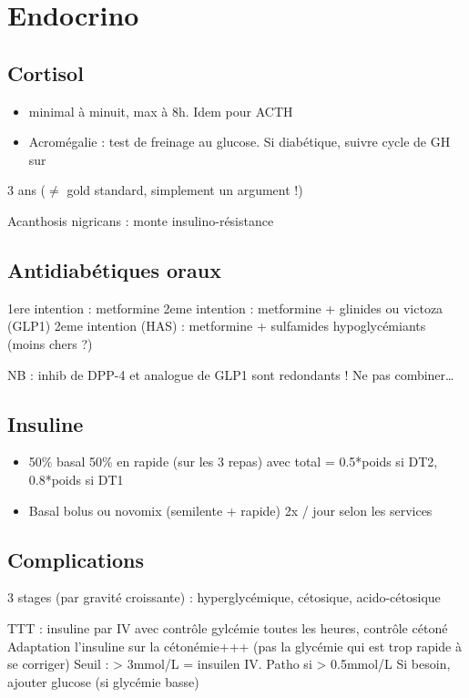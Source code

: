 \documentclass[11pt]{article}
\date{\today}
\title{}
\begin{document}
\tableofcontents

\section{Endocrino}
\label{sec:org7ea4546}
\subsection{Cortisol}
\label{sec:org8ed4be4}
\begin{itemize}
\item minimal à minuit, max à 8h. Idem pour ACTH
\item Acromégalie : test de freinage au glucose. Si diabétique, suivre cycle de GH sur
\end{itemize}
3 ans (\(\ne\) gold standard, simplement un argument !)

Acanthosis nigricans : monte insulino-résistance
\subsection{Antidiabétiques oraux}
\label{sec:orge555e85}
1ere intention : metformine
2eme intention : metformine + glinides ou victoza (GLP1) 
2eme intention (HAS) : metformine + sulfamides hypoglycémiants (moins chers ?)

NB : inhib de DPP-4 et analogue de GLP1 sont redondants ! Ne pas combiner\ldots{}

\subsection{Insuline}
\label{sec:org6982df6}
\begin{itemize}
\item 50\% basal 50\% en rapide (sur les 3 repas) avec total = 0.5*poids si DT2, 0.8*poids si DT1
\item Basal bolus ou novomix (semilente + rapide) 2x / jour selon les services
\end{itemize}
\subsection{Complications}
\label{sec:org17418b2}
3 stages (par gravité croissante) : hyperglycémique, cétosique, acido-cétosique

TTT : insuline par IV avec contrôle gylcémie toutes les heures, contrôle cétoné
Adaptation l'insuline sur la cétonémie+++ (pas la glycémie qui est trop rapide à se corriger)
Seuil : > 3mmol/L = insuilen IV. Patho si > 0.5mmol/L
Si besoin, ajouter glucose (si glycémie basse)
\end{document}
